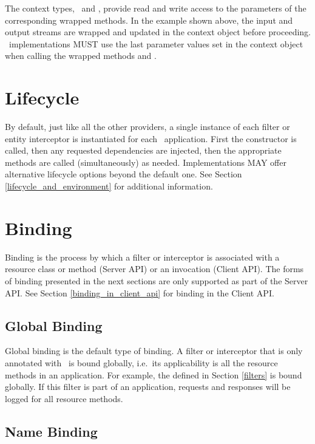 The context types, \ReaderInterceptorContext\ and \WriterInterceptorContext, provide read and write access to the parameters of the corresponding wrapped methods. In the example shown above, the input and output streams are wrapped and updated in the context object before proceeding. \jaxrs\ implementations MUST use the last parameter values set in the context object when calling the wrapped methods  and .

\section{Lifecycle}

By default, just like all the other providers, a single instance of each filter or entity interceptor is instantiated for each \jaxrs\ application. First the constructor is called, then any requested dependencies are injected, then the appropriate methods are called (simultaneously) as needed. Implementations MAY offer alternative lifecycle options beyond the default one. See Section \ref{lifecycle_and_environment} for additional information.

\section{Binding}

Binding is the process by which a filter or interceptor is associated with a resource class or method (Server API) or an invocation (Client API). The forms of binding presented in the next sections are only supported as part of the Server API. See Section \ref{binding_in_client_api} for binding in the Client API.

\subsection{Global Binding}
\label{global_binding}

Global binding is the default type of binding. A filter or interceptor that is only annotated with \Provider\ is bound globally, i.e.~its applicability is all the resource methods in an application. For example, the  defined in Section \ref{filters} is bound globally. If this filter is part of an application, requests and responses will be logged for all resource methods. 

\subsection{Name Binding}
\label{Name_Binding}

